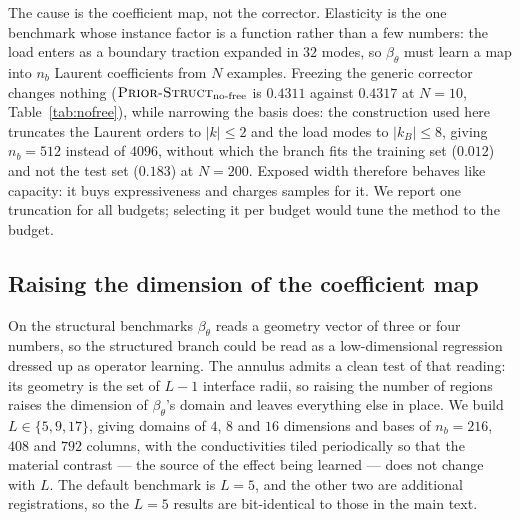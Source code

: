 \documentclass{article}
\newcommand{\armstruct}{\textsc{Prior-Struct}}
\begin{document}
The cause is the coefficient map, not the corrector. Elasticity is the one benchmark whose
instance factor is a function rather than a few numbers: the load enters as a boundary traction
expanded in $32$ modes, so $\beta_\theta$ must learn a map into $n_b$ Laurent coefficients from
$N$ examples. Freezing the generic corrector changes nothing ($\armstruct_{\text{no-free}}$ is
$0.4311$ against $0.4317$ at $N{=}10$, Table~\ref{tab:nofree}), while narrowing the basis does:
the construction used here truncates the Laurent orders to $|k|\le2$ and the load modes to
$|k_B|\le8$, giving $n_b=512$ instead of $4096$, without which the branch fits the training set
($0.012$) and not the test set ($0.183$) at $N{=}200$. Exposed width therefore behaves like
capacity: it buys expressiveness and charges samples for it. We report one truncation for all
budgets; selecting it per budget would tune the method to the budget.






\subsection{Raising the dimension of the coefficient map}
\label{app:beta-dim}

On the structural benchmarks $\beta_\theta$ reads a geometry vector of three or four numbers, so
the structured branch could be read as a low-dimensional regression dressed up as operator
learning. The annulus admits a clean test of that reading: its geometry is the set of $L-1$
interface radii, so raising the number of regions raises the dimension of $\beta_\theta$'s domain
and leaves everything else in place. We build $L\in\{5,9,17\}$, giving domains of $4$, $8$ and
$16$ dimensions and bases of $n_b=216$, $408$ and $792$ columns, with the conductivities tiled
periodically so that the material contrast --- the source of the effect being learned --- does
not change with $L$. The default benchmark is $L{=}5$, and the other two are additional
registrations, so the $L{=}5$ results are bit-identical to those in the main text.
\end{document}
